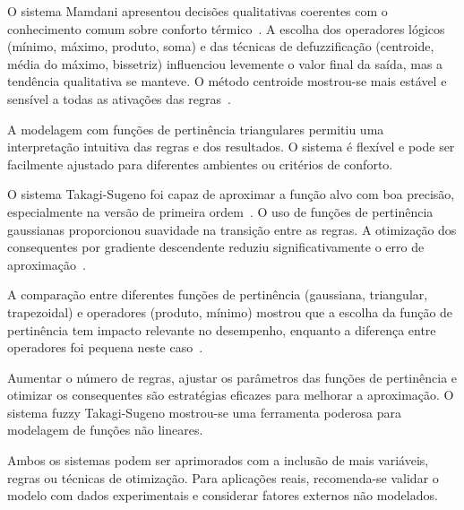 O sistema Mamdani apresentou decisões qualitativas coerentes com o conhecimento comum sobre conforto térmico~\cite{ross2010fuzzy}. A escolha dos operadores lógicos (mínimo, máximo, produto, soma) e das técnicas de defuzzificação (centroide, média do máximo, bissetriz) influenciou levemente o valor final da saída, mas a tendência qualitativa se manteve. O método centroide mostrou-se mais estável e sensível a todas as ativações das regras~\cite{ross2010fuzzy}.

A modelagem com funções de pertinência triangulares permitiu uma interpretação intuitiva das regras e dos resultados. O sistema é flexível e pode ser facilmente ajustado para diferentes ambientes ou critérios de conforto.

O sistema Takagi-Sugeno foi capaz de aproximar a função alvo com boa precisão, especialmente na versão de primeira ordem~\cite{takagi1985fuzzy}. O uso de funções de pertinência gaussianas proporcionou suavidade na transição entre as regras. A otimização dos consequentes por gradiente descendente reduziu significativamente o erro de aproximação~\cite{haykin2008neural}.

A comparação entre diferentes funções de pertinência (gaussiana, triangular, trapezoidal) e operadores (produto, mínimo) mostrou que a escolha da função de pertinência tem impacto relevante no desempenho, enquanto a diferença entre operadores foi pequena neste caso~\cite{ross2010fuzzy}.

Aumentar o número de regras, ajustar os parâmetros das funções de pertinência e otimizar os consequentes são estratégias eficazes para melhorar a aproximação. O sistema fuzzy Takagi-Sugeno mostrou-se uma ferramenta poderosa para modelagem de funções não lineares.

Ambos os sistemas podem ser aprimorados com a inclusão de mais variáveis, regras ou técnicas de otimização. Para aplicações reais, recomenda-se validar o modelo com dados experimentais e considerar fatores externos não modelados.